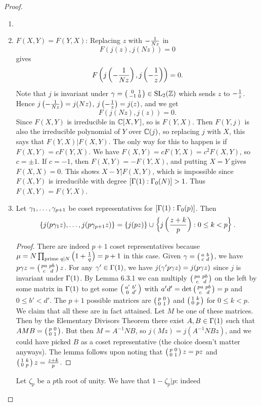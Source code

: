 \begin{proof}
\begin{enumerate}
\item
\item $F(X,Y)=F(Y,X)$:
Replacing $z$ with $-\frac{1}{Nz}$ in 
\[
F(j(z),j(Nz))=0
\]
gives
\begin{align*}
F\left( {
j\left( {-\frac{1}{Nz}} \right),j\left( {-\frac{1}{z}} \right)
} \right)=0.
\end{align*}
Note that $j$ is invariant under $\gamma=\left(\begin{smallmatrix} {0}&{1}\\ {-1}&{0} \end{smallmatrix}\right)\in \operatorname{SL}_2(\mathbb{Z})$ which sends $z$ to $-\frac{1}{z}$. Hence $j\left( {-\frac{1}{Nz}} \right)=j(Nz)$, $j\left( {-\frac{1}{z}} \right)=j(z)$, and we get
\[
F(j(Nz),j(z))=0.
\]
Since $F(X,Y)$ is irreducible in $\mathbb{C}[X,Y]$, so is $F(Y,X)$. 
Then $F(Y,j)$ is also the irreducible polynomial of $Y$ over $\mathbb{C}(j)$, so replacing $j$ with $X$, this says that $F(Y,X)|F(X,Y)$. The only way for this to happen is if $F(X,Y)=cF(Y,X)$. We have $F(X,Y)=cF(Y,X)=c^2F(X,Y)$, so $c=\pm 1$. If $c=-1$, then $F(X,Y)=-F(Y,X)$, and putting $X=Y$ gives $F(X,X)=0$. This shows $X-Y|F(X,Y)$, which is impossible since $F(X,Y)$ is irreducible with degree $[\Gamma(1):\Gamma_0(N)]>1$. Thus $F(X,Y)=F(Y,X)$.
\item\begin{lem}
Let $\gamma_1,\ldots, \gamma_{p+1}$ be coset representatives for $[\Gamma(1):\Gamma_0(p)]$. Then 
\[
\{j(p\gamma_1z),\ldots,j(p\gamma_{p+1}z)\}=\{j(pz)\}\cup\left\{ {j\left( {\frac{z+k}{p}} \right):0\le k<p} \right\}.
\]
\end{lem}
\begin{proof}
There are indeed $p+1$ coset representatives because $\mu=N\prod_{\text{prime } q|N}\left( {1+\frac{1}{q}} \right)=p+1$ in this case.
%
Given $\gamma=\left(\begin{smallmatrix} {a}&{b}\\ {c}&{d} \end{smallmatrix}\right)$, we have $p\gamma z=\left(\begin{smallmatrix} {pa}&{pb}\\ {c}&{d} \end{smallmatrix}\right)z$. 
For any $\gamma'\in \Gamma(1)$, we have $j(\gamma'p\gamma z)=j(p\gamma z)$ since $j$ is invariant under $\Gamma(1)$. By Lemma 6.3.1 we can multiply $\left(\begin{smallmatrix} {pa}&{pb}\\ {c}&{d} \end{smallmatrix}\right)$ on the left by some matrix in $\Gamma(1)$ to get some $\left(\begin{smallmatrix} {a'}&{b'}\\ {0}&{d'} \end{smallmatrix}\right)$ with $a'd'=\det\left(\begin{smallmatrix} {pa}&{pb}\\ {c}&{d} \end{smallmatrix}\right)=p$ and $0\le b'<d'$. The $p+1$ possible matrices are $\left(\begin{smallmatrix} {p}&{0}\\ {0}&{1} \end{smallmatrix}\right)$ and $\left(\begin{smallmatrix} {1}&{k}\\ {0}&{p} \end{smallmatrix}\right)$ for $0\leq k<p$. We claim that all these are in fact attained. Let $M$ be one of these matrices. Then by the Elementary Divisors Theorem there exist $A,B\in \Gamma(1)$ such that $AMB=\left(\begin{smallmatrix} {p}&{0}\\ {0}&{1} \end{smallmatrix}\right)$. But then $M=A^{-1}NB$, so $j(Mz)=j(A^{-1}NBz)$, and we could have picked $B$ as a coset representative (the choice doesn't matter anyways). The lemma follows upon noting that $\left(\begin{smallmatrix} {p}&{0}\\ {0}&{1} \end{smallmatrix}\right)z=pz$ and $\left(\begin{smallmatrix} {1}&{k}\\ {0}&{p} \end{smallmatrix}\right)z=\frac{z+k}{p}$.
\end{proof}
Let $\zeta_p$ be a $p$th root of unity. %
We have that $1-\zeta_p|p$: indeed 

\end{enumerate}
\end{proof}
